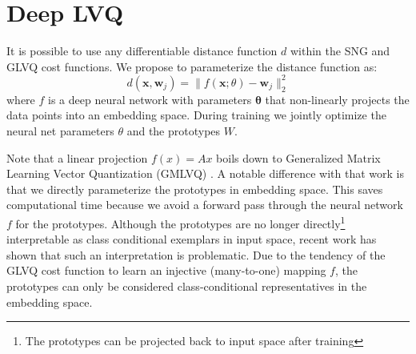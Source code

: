 \documentclass{esannV2}
\begin{document}

\section{Deep LVQ}
It is possible to use any differentiable distance function $d$ within the SNG and GLVQ cost functions. We propose to parameterize the distance function as:
\begin{equation}
 d(\mathbf{x}, \mathbf{w}_j) = \|f(\mathbf{x}; \theta) - \mathbf{w}_j\|^2_2
\end{equation}
where $f$ is a deep neural network with parameters $\mathbf{\theta}$ that non-linearly projects the data points into an embedding space. During training we jointly optimize the neural net parameters $\theta$ and the prototypes $W$. 

Note that a linear projection $f(x) = Ax$ boils down to Generalized Matrix Learning Vector Quantization (GMLVQ) \cite{schneider2009adaptive,bunte2012limited}. A notable difference with that work is that we directly parameterize the prototypes in embedding space. This saves computational time because we avoid a forward pass through the neural network $f$ for the prototypes. Although the prototypes are no longer directly\footnote{The prototypes can be projected back to input space after training} interpretable as class conditional exemplars in input space, recent work\cite{de2013stationarity} has shown that such an interpretation is problematic. Due to the tendency of the GLVQ cost function to learn an injective (many-to-one) mapping $f$, the prototypes can only be considered class-conditional representatives in the embedding space. 
\end{document}
